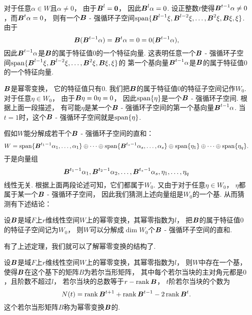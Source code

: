 对于任意\(\alpha \in W\)且\(\alpha\neq0\)，
由于\(\boldsymbol{B}^l=\boldsymbol0\)，
因此\(\boldsymbol{B}^l\alpha=0\).
设正整数\(t\)使得\(\boldsymbol{B}^{t-1}\alpha\neq0\)，而\(\boldsymbol{B}^t\alpha=0\)，
则有一个\(\boldsymbol{B}\) - 强循环子空间\(\operatorname{span}\{\boldsymbol{B}^{l-1}\xi,\boldsymbol{B}^{l-2}\xi,\dotsc,\boldsymbol{B}^2\xi,\boldsymbol{B}\xi,\xi\}\).
由于\begin{equation*}
	\boldsymbol{B}(\boldsymbol{B}^{t-1}\alpha)
	= \boldsymbol{B}^t\alpha
	= 0
	= 0(\boldsymbol{B}^{t-1}\alpha),
\end{equation*}
因此\(\boldsymbol{B}^{t-1}\alpha\)是\(\boldsymbol{B}\)的属于特征值\(0\)的一个特征向量.
这表明任意一个\(\boldsymbol{B}\) - 强循环子空间\(\operatorname{span}\{\boldsymbol{B}^{l-1}\xi,\boldsymbol{B}^{l-2}\xi,\dotsc,\boldsymbol{B}^2\xi,\boldsymbol{B}\xi,\xi\}\)的
第一个基向量\(\boldsymbol{B}^{t-1}\alpha\)是\(\boldsymbol{B}\)的属于特征值\(0\)的一个特征向量.

\(\boldsymbol{B}\)是幂零变换，
它的特征值只有\(0\).
我们把\(\boldsymbol{B}\)的属于特征值\(0\)的特征子空间记作\(W_0\).
对于任意\(\eta \in W_0\)，
由于\(\boldsymbol{B}\eta = 0\eta = 0\)，
因此\(\operatorname{span}\{\eta\}\)是一个\(\boldsymbol{B}\) - 强循环子空间.
根据上面一段描述，
有可能\(\eta\)是某一个\(\boldsymbol{B}\) - 强循环子空间的第一个基向量\(\boldsymbol{B}^{t-1}\alpha\).
当\(t=1\)时，这个\(\boldsymbol{B}\) - 强循环子空间就是\(\operatorname{span}\{\eta\}\).

假如\(W\)能分解成若干个\(\boldsymbol{B}\) - 强循环子空间的直和：\begin{equation*}
	W = \operatorname{span}\{\boldsymbol{B}^{t_1-1}\alpha_1,\dotsc,\alpha_1\}
		\oplus \dotsb
		\oplus \operatorname{span}\{\boldsymbol{B}^{t_s-1}\alpha_s,\dotsc,\alpha_s\}
		\oplus \operatorname{span}\{\eta_1\}
		\oplus \dotsb
		\oplus \operatorname{span}\{\eta_q\}.
\end{equation*}
于是向量组\begin{equation*}
	\boldsymbol{B}^{t_1-1}\alpha_1,
	\boldsymbol{B}^{t_2-1}\alpha_2,
	\dotsc,
	\boldsymbol{B}^{t_s-1}\alpha_s,
	\eta_1,
	\dotsc,
	\eta_q
\end{equation*}线性无关.
根据上面两段论述可知，它们都属于\(W_0\).
又由于对于任意\(\eta \in W_0\)，
\(\eta\)都属于某一个\(\boldsymbol{B}\) - 强循环子空间，
因此我们猜测上述向量组是\(W_0\)的一个基.
从而猜测有下述结论：
\begin{theorem}
设\(\boldsymbol{B}\)是域\(F\)上\(r\)维线性空间\(W\)上的幂零变换，其幂零指数为\(l\)，
把\(\boldsymbol{B}\)的属于特征值\(0\)的特征子空间记为\(W_0\)，
则\(W\)可以分解成\(\dim W_0\)个\(\boldsymbol{B}\) - 强循环子空间的直和.
\end{theorem}

有了上述定理，我们就可以了解幂零变换的结构了.
\begin{theorem}
设\(\boldsymbol{B}\)是域\(F\)上\(r\)维线性空间\(W\)上的幂零变换，其幂零指数为\(l\)，
则\(W\)中存在一个基，使得\(\boldsymbol{B}\)在这个基下的矩阵\(B\)为若尔当形矩阵，
其中每个若尔当块的主对角元都是\(0\)，且阶数不超过\(l\)，
若尔当块的总数等于\(r - \rank\boldsymbol{B}\)，
\(t\)阶若尔当块的个数为\begin{equation}
	N(t) = \rank\boldsymbol{B}^{t+1} + \rank\boldsymbol{B}^{t-1} - 2 \rank\boldsymbol{B}^t.
\end{equation}
\rm
这个若尔当形矩阵\(B\)称为幂零变换\(\boldsymbol{B}\)的.
\end{theorem}

